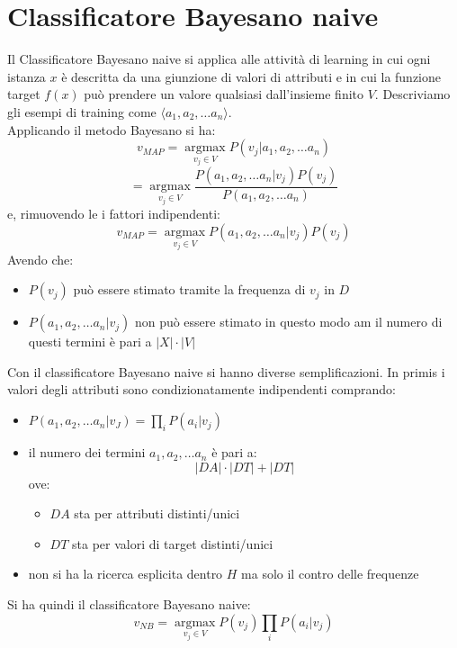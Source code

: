 \section{Classificatore Bayesano naive}
Il Classificatore Bayesano naive si applica alle attività di learning in
cui ogni istanza $x$ è descritta da una giunzione di valori di attributi e in
cui la funzione target $f(x)$ può prendere un valore qualsiasi dall'insieme
finito $V$. Descriviamo gli esempi di training come $\langle a_1, a_2,\ldots
a_n\rangle $. \\
Applicando il metodo Bayesano si ha:
\[v_{MAP}=\operatorname*{argmax}_{v_j\in V}P(v_j|a_1, a_2,\ldots a_n)\]
\[=\operatorname*{argmax}_{v_j\in V}\frac{P(a_1, a_2,\ldots
    a_n|v_j)P(v_j)}{P(a_1, a_2,\ldots a_n)}\]
e, rimuovendo le i fattori indipendenti:
\[v_{MAP}=\operatorname*{argmax}_{v_j\in V}P(a_1, a_2,\ldots a_n|v_j)P(v_j)\]
Avendo che:
\begin{itemize}
  \item $P(v_j)$ può essere stimato tramite la frequenza di $v_j$ in $D$
  \item $P(a_1, a_2,\ldots a_n|v_j)$ non può essere stimato in questo modo am il
  numero di questi termini è pari a $|X|\cdot |V|$
\end{itemize}
Con il classificatore Bayesano naive si hanno diverse semplificazioni. In primis
i valori degli attributi sono condizionatamente indipendenti comprando:
\begin{itemize}
  \item $P(a_1, a_2,\ldots a_n|v_J)=\prod_iP(a_i|v_j)$
  \item il numero dei termini $a_1, a_2,\ldots a_n$ è pari a:
  \[|DA|\cdot |DT|+|DT|\]
  ove:
  \begin{itemize}
    \item $DA$ sta per attributi distinti/unici
    \item $DT$ sta per valori di target distinti/unici
  \end{itemize}
  \item non si ha la ricerca esplicita dentro $H$ ma solo il contro delle
  frequenze 
\end{itemize}
Si ha quindi il classificatore Bayesano naive:
\[v_{NB}=\operatorname*{argmax}_{v_j\in V}P(v_j)\prod_iP(a_i|v_j)\]
\newpage

